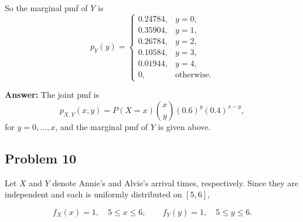 \begin{enumerate}
    So the marginal pmf of $Y$ is
    \[
    p_Y(y)=
    \begin{cases}
    0.24784, & y=0,\\
    0.35904, & y=1,\\
    0.26784, & y=2,\\
    0.10584, & y=3,\\
    0.01944, & y=4,\\
    0, & \text{otherwise}.
    \end{cases}
    \]

    \textbf{Answer:} The joint pmf is
    \[
    p_{X,Y}(x,y)=P(X=x)\binom{x}{y}(0.6)^y(0.4)^{x-y},
    \]
    for $y=0,\dots,x$, and the marginal pmf of $Y$ is given above.
\end{enumerate}

\subsection*{Problem 10}

Let $X$ and $Y$ denote Annie's and Alvie's arrival times, respectively. Since they are independent and each is uniformly distributed on $[5,6]$,

\[
f_X(x)=1,\quad 5\le x\le 6,
\qquad
f_Y(y)=1,\quad 5\le y\le 6.
\]

